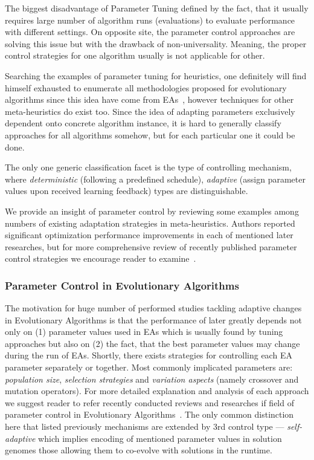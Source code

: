 The biggest disadvantage of Parameter Tuning defined by the fact, that it usually requires large number of algorithm runs (evaluations) to evaluate performance with different settings.
On opposite site, the parameter control approaches are solving this issue but with the drawback of non-universality. Meaning, the proper control strategies for one algorithm usually is not applicable for other.

Searching the examples of parameter tuning for heuristics, one definitely will find himself exhausted to enumerate all methodologies proposed for evolutionary algorithms since this idea have come from EAs~\cite{karafotias2014parameter}, however techniques for other meta-heuristics do exist too.
Since the idea of adapting parameters exclusively dependent onto concrete algorithm instance, it is hard to generally classify approaches for all algorithms somehow, but for each particular one it could be done.

The only one generic classification facet is the type of controlling mechanism, where \textit{deterministic} (following a predefined schedule), \textit{adaptive} (assign parameter values upon received learning feedback) types are distinguishable.

We provide an insight of parameter control by reviewing some examples among numbers of existing adaptation strategies in meta-heuristics.
Authors reported significant optimization performance improvements in each of mentioned later researches, but for more comprehensive review of recently published parameter control strategies we encourage reader to examine~\cite{huang2019survey}.

\subsubsection{Parameter Control in Evolutionary Algorithms} 
The motivation for huge number of performed studies tackling adaptive changes in Evolutionary Algorithms is that the performance of later greatly depends not only on (1) parameter values used in EAs which is usually found by tuning approaches but also on (2) the fact, that the best parameter values may change during the run of EAs. 
Shortly, there exists strategies for controlling each EA parameter separately or together.  Most commonly implicated parameters are: \textit{population size}, \textit{selection strategies} and \textit{variation aspects} (namely crossover and mutation operators). For more detailed explanation and analysis of each approach we suggest reader to refer recently conducted reviews and researches if field of parameter control in Evolutionary Algorithms~\cite{karafotias2014parameter,aleti2016systematic,smith2020self}.
The only common distinction here that listed previously mechanisms are extended by 3rd control type — \textit{self-adaptive} which implies encoding of mentioned parameter values in solution genomes those allowing them to co-evolve with solutions in the runtime. 

